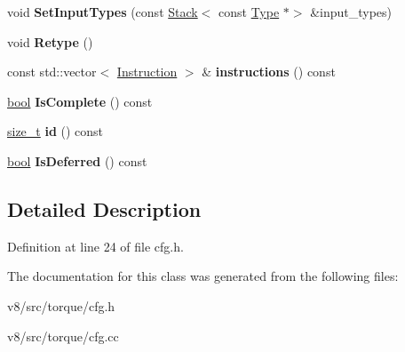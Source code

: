 \begin{DoxyCompactItemize}
void {\bfseries Set\+Input\+Types} (const \mbox{\hyperlink{classv8_1_1internal_1_1torque_1_1Stack}{Stack}}$<$ const \mbox{\hyperlink{classv8_1_1internal_1_1torque_1_1Type}{Type}} $\ast$$>$ \&input\+\_\+types)
\item 
\mbox{\label{classv8_1_1internal_1_1torque_1_1Block_a63459ecacdeeb351bc2d892b3e558f21}} 
void {\bfseries Retype} ()
\item 
\mbox{\label{classv8_1_1internal_1_1torque_1_1Block_a747c79cf63bcc637baf0d08818df860f}} 
const std\+::vector$<$ \mbox{\hyperlink{classv8_1_1internal_1_1torque_1_1Instruction}{Instruction}} $>$ \& {\bfseries instructions} () const
\item 
\mbox{\label{classv8_1_1internal_1_1torque_1_1Block_a412256096628845cd81ab5cf4c87a5e0}} 
\mbox{\hyperlink{classbool}{bool}} {\bfseries Is\+Complete} () const
\item 
\mbox{\label{classv8_1_1internal_1_1torque_1_1Block_af73b8d0d391734109f9efd673c3ed336}} 
\mbox{\hyperlink{classsize__t}{size\+\_\+t}} {\bfseries id} () const
\item 
\mbox{\label{classv8_1_1internal_1_1torque_1_1Block_a306af9bd15c8155ce8adf7a918b3d754}} 
\mbox{\hyperlink{classbool}{bool}} {\bfseries Is\+Deferred} () const
\end{DoxyCompactItemize}


\subsection{Detailed Description}


Definition at line 24 of file cfg.\+h.



The documentation for this class was generated from the following files\+:\begin{DoxyCompactItemize}
\item 
v8/src/torque/cfg.\+h\item 
v8/src/torque/cfg.\+cc\end{DoxyCompactItemize}
